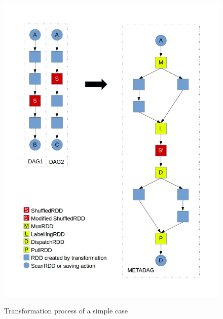 \begin{itemize}
\begin{figure}
\includegraphics[width=\textwidth]{Figures/singlemetajob.jpg}
\label{fig:simplemetajob}
\caption{Transformation process of a simple case}
\end{figure}


\end{itemize}
